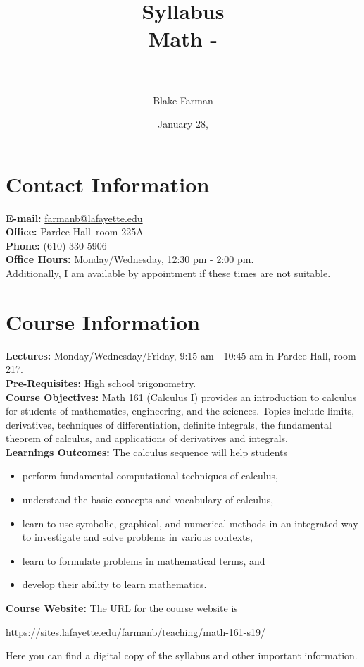 \documentclass[12pt]{amsart}
\author[Blake Farman]{Blake Farman}
\title[Syllabus]{Syllabus\\Math \course-\courseSection \\ \semester\ \year}
\date{January 28, \year}
\def\building{Pardee Hall}
\def\officeNumber{225A}
\def\courseWebsite{https://sites.lafayette.edu/farmanb/teaching/math-161-s19/}
\begin{document}
\maketitle

\section*{Contact Information}
\noindent
\textbf{E-mail:} \href{mailto:farmanb@lafayette.edu}{farmanb@lafayette.edu}\\
\textbf{Office:} \building\ room \officeNumber\\
\textbf{Phone:} (610) 330-5906\\
\textbf{Office Hours:} Monday/Wednesday, 12:30 pm - 2:00 pm.\\
Additionally, I am available by appointment if these times are not suitable.

\section*{Course Information}
\noindent
\textbf{Lectures:}
Monday/Wednesday/Friday,  9:15 am - 10:45 am in Pardee Hall, room 217.\\

\noindent\textbf{Pre-Requisites:} High school trigonometry.\\

\noindent\textbf{Course Objectives:}
Math 161 (Calculus I) provides an introduction to calculus for students of mathematics, engineering, and the sciences. Topics include limits, derivatives, techniques of differentiation, definite integrals, the fundamental theorem of calculus, and applications of derivatives and integrals.\\

\noindent\textbf{Learnings Outcomes:}
The calculus sequence will help students
\begin{itemize}
\item
  perform fundamental computational techniques of calculus,
\item
  understand the basic concepts and vocabulary of calculus,
\item
  learn to use symbolic, graphical, and numerical methods in an integrated way to investigate and solve problems in various contexts,
\item
  learn to formulate problems in mathematical terms, and
\item
  develop their ability to learn mathematics.
\end{itemize}
\noindent\textbf{Course Website:} The URL for the course website is
\begin{center}
  \url{\courseWebsite}
\end{center}
Here you can find a digital copy of the syllabus and other important information.\\
\end{document}

